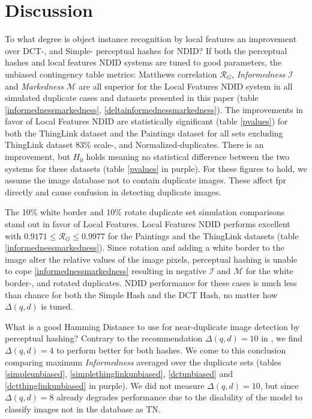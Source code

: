\documentclass[english,12pt,a4paper,pdftex,elec,utf8, table]{aaltothesis}
\begin{document}
\section{Discussion}
To what degree is object instance recognition by local features an improvement over DCT-, and Simple- perceptual hashes for NDID? If both the perceptual hashes and local features NDID systems are tuned to good parameters, the unbiased contingency table metrics: Matthews correlation $\mathcal{R}_G$, \emph{Informedness} $\mathcal{I}$ and \emph{Markedness} $\mathcal{M}$ are all superior for the Local Features NDID system in all simulated duplicate cases and datasets presented in this paper (table \ref{informednessmarkedness}, \ref{deltainformednessmarkedness}). The improvements in favor of Local Features NDID are statistically significant (table \ref{pvalues}) for both the ThingLink dataset and the Paintings dataset for all sets excluding ThingLink dataset 83\% scale-, and Normalized-duplicates. There is an improvement, but $H_0$ holds meaning no statistical difference between the two systems for these datasets (table \ref{pvalues} in purple). For these figures to hold, we assume the image database not to contain duplicate images. These affect fpr directly and cause confusion in detecting duplicate images.

The 10\% white border and 10\% rotate duplicate set simulation comparisons stand out in favor of Local Features. Local Features NDID performs excellent with $0.9171 \leq \mathcal{R}_G \leq 0.9977$ for the Paintings and the ThingLink datasets (table \ref{informednessmarkedness}). Since rotation and adding a white border to the image alter the relative values of the image pixels, perceptual hashing is unable to cope \ref{informednessmarkedness} resulting in negative $\mathcal{I}$ and $\mathcal{M}$ for the white border-, and rotated duplicates. NDID performance for these cases is much less than chance for both the Simple Hash and the DCT Hash, no matter how $\Delta(q,d)$ is tuned.

What is a good Hamming Distance to use for near-duplicate image detection by perceptual hashing? Contrary to the recommendation $\Delta(q,d)=10$ in \cite{Zauner2010}, we find $\Delta(q,d)=4$ to perform better for both hashes. We come to this conclusion comparing maximum \emph{Informedness} averaged over the duplicate sets (tables \ref{simpleunbiased}, \ref{simplethinglinkunbiased}, \ref{dctunbiased} and \ref{dctthinglinkunbiased} in purple). We did not measure $\Delta(q,d)=10$, but since $\Delta(q,d)=8$ already degrades performance due to the disability of the model to classify images not in the database as TN.
\end{document}
